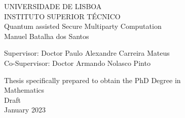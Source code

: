 \begin{center}
\vspace{0.5cm}
{\FontLb UNIVERSIDADE DE LISBOA} \\
\vspace{0.2cm}
{\FontLb INSTITUTO SUPERIOR T\'{E}CNICO} \\


\vspace{5.0cm}
{\FontHb 
Quantum assisted Secure Multiparty Computation} \\

\vspace{3cm}
{\FontLn Manuel Batalha dos Santos} \\
\vspace{2cm}

\end{center}
\begin{flushleft}


{\FontMb Supervisor: \FontMn \qquad Doctor Paulo Alexandre Carreira Mateus} \\
{\FontMb Co-Supervisor: \FontMn \hspace{.0em} Doctor Armando Nolasco Pinto} \\

\vspace{2.5cm}

\end{flushleft}
\begin{center}

{\FontMn Thesis specifically prepared to obtain the PhD Degree in} \\
{\FontMn Mathematics} \\
\vspace{1cm}
{\FontLn Draft} \\
\vspace{1cm}
{\FontMb January 2023} \\
%
\end{center}

\cleardoublepage
